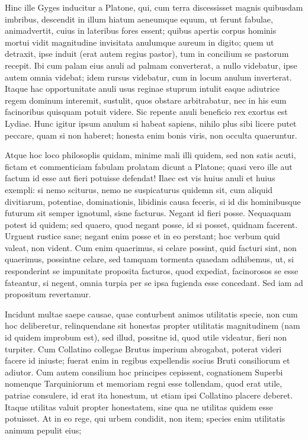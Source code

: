  Hinc ille Gyges inducitur a Platone, qui, cum terra discessisset magnis quibusdam imbribus, descendit in illum hiatum aeneumque equum, ut ferunt fabulae, animadvertit, cuius in lateribus fores essent; quibus apertis corpus hominis mortui vidit magnitudine invisitata anulumque aureum in digito; quem ut detraxit, ipse induit (erat autem regius pastor), tum in concilium se pastorum recepit. Ibi cum palam eius anuli ad palmam converterat, a nullo videbatur, ipse autem omnia videbat; idem rursus videbatur, cum in locum anulum inverterat. Itaque hac opportunitate anuli usus reginae stuprum intulit eaque adiutrice regem dominum interemit, sustulit, quos obstare arbitrabatur, nec in his eum facinoribus quisquam potuit videre. Sic repente anuli beneficio rex exortus est Lydiae. Hunc igitur ipsum anulum si habeat sapiens, nihilo plus sibi licere putet peccare, quam si non haberet; honesta enim bonis viris, non occulta quaeruntur.

 Atque hoc loco philosoplis quidam, minime mali illi quidem, sed non satis acuti, fictam et commenticiam fabulam prolatam dicunt a Platone; quasi vero ille aut factum id esse aut fieri potuisse defendat! Ilaec est vis huius anuli et huius exempli: si nemo sciturus, nemo ne suspicaturus quidemn sit, cum aliquid divitiarum, potentiae, dominationis, libidinis causa feceris, si id dis hominibusque futurum sit semper ignotuml, sisne facturus. Negant id fieri posse. Nequaquam potest id quidem; sed quaero, quod negant posse, id si posset, quidnam facerent. Urguent rustice sane; negant enim posse et in eo perstant; hoc verbum quid valeat, non vident. Cum enim quaerimus, si celare possint, quid facturi sint, non quaerimus, possintne celare, sed tamquam tormenta quaedam adhibemus, ut, si responderint se impunitate proposita facturos, quod expediat, facinorosos se esse fateantur, si negent, omnia turpia per se ipsa fugienda esse concedant. Sed iam ad propositum revertamur.

 Incidunt multae saepe causae, quae conturbent animos utilitatis specie, non cum hoc deliberetur, relinquendane sit honestas propter utilitatis magnitudinem (nam id quidem improbum est), sed illud, possitne id, quod utile videatur, fieri non turpiter. Cum Collatino collegae Brutus imperium abrogabat, poterat videri facere id iniuste; fuerat enim in regibus expellendis socius Bruti consiliorum et adiutor. Cum autem consilium hoc principes cepissent, cognationem Superbi nomenque Tarquiniorum et memoriam regni esse tollendam, quod erat utile, patriae consulere, id erat ita honestum, ut etiam ipsi Collatino placere deberet. Itaque utilitas valuit propter honestatem, sine qua ne utilitas quidem esse potuisset. At in eo rege, qui urbem condidit, non item; species enim utilitatis animum pepulit eius;

